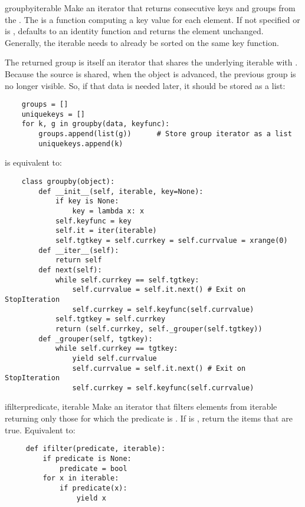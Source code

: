 \begin{funcdesc}{groupby}{iterable}
  Make an iterator that returns consecutive keys and groups from the
  . The  is a function computing a key value for each
  element.  If not specified or is ,  defaults to an
  identity function and returns  the element unchanged.  Generally, the
  iterable needs to already be sorted on the same key function.

  The returned group is itself an iterator that shares the underlying
  iterable with .  Because the source is shared, when
  the  object is advanced, the previous group is no
  longer visible.  So, if that data is needed later, it should be stored
  as a list:

  \begin{verbatim}
    groups = []
    uniquekeys = []
    for k, g in groupby(data, keyfunc):
        groups.append(list(g))      # Store group iterator as a list
        uniquekeys.append(k)
  \end{verbatim}

   is equivalent to:

  \begin{verbatim}
    class groupby(object):
        def __init__(self, iterable, key=None):
            if key is None:
                key = lambda x: x
            self.keyfunc = key
            self.it = iter(iterable)
            self.tgtkey = self.currkey = self.currvalue = xrange(0)
        def __iter__(self):
            return self
        def next(self):
            while self.currkey == self.tgtkey:
                self.currvalue = self.it.next() # Exit on StopIteration
                self.currkey = self.keyfunc(self.currvalue)
            self.tgtkey = self.currkey
            return (self.currkey, self._grouper(self.tgtkey))
        def _grouper(self, tgtkey):
            while self.currkey == tgtkey:
                yield self.currvalue
                self.currvalue = self.it.next() # Exit on StopIteration
                self.currkey = self.keyfunc(self.currvalue)
  \end{verbatim}
\end{funcdesc}

\begin{funcdesc}{ifilter}{predicate, iterable}
  Make an iterator that filters elements from iterable returning only
  those for which the predicate is .
  If  is , return the items that are true.
  Equivalent to:

  \begin{verbatim}
     def ifilter(predicate, iterable):
         if predicate is None:
             predicate = bool
         for x in iterable:
             if predicate(x):
                 yield x
  \end{verbatim}
\end{funcdesc}


